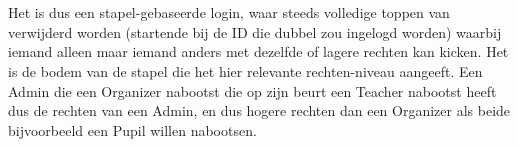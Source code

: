 \begin{section}
\\\\
Het is dus een stapel-gebaseerde login, waar steeds volledige toppen van verwijderd worden (startende bij de ID die dubbel zou ingelogd worden) waarbij iemand alleen maar iemand anders met dezelfde of lagere rechten kan kicken. Het is de bodem van de stapel die het hier relevante rechten-niveau aangeeft. Een Admin die een Organizer nabootst die op zijn beurt een Teacher nabootst heeft dus de rechten van een Admin, en dus hogere rechten dan een Organizer als beide bijvoorbeeld een Pupil willen nabootsen.
\end{section}
